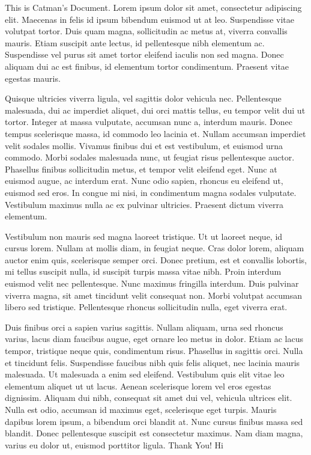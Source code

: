 \documentclass[11pt]{article}
\begin{document}
This is Catman's Document.
Lorem ipsum dolor sit amet, consectetur adipiscing elit. Maecenas in felis id ipsum bibendum euismod ut at leo. Suspendisse vitae volutpat tortor. Duis quam magna, sollicitudin ac metus at, viverra convallis mauris. Etiam suscipit ante lectus, id pellentesque nibh elementum ac. Suspendisse vel purus sit amet tortor eleifend iaculis non sed magna. Donec aliquam dui ac est finibus, id elementum tortor condimentum. Praesent vitae egestas mauris.

Quisque ultricies viverra ligula, vel sagittis dolor vehicula nec. Pellentesque malesuada, dui ac imperdiet aliquet, dui orci mattis tellus, eu tempor velit dui ut tortor. Integer at massa vulputate, accumsan nunc a, interdum mauris. Donec tempus scelerisque massa, id commodo leo lacinia et. Nullam accumsan imperdiet velit sodales mollis. Vivamus finibus dui et est vestibulum, et euismod urna commodo. Morbi sodales malesuada nunc, ut feugiat risus pellentesque auctor. Phasellus finibus sollicitudin metus, et tempor velit eleifend eget. Nunc at euismod augue, ac interdum erat. Nunc odio sapien, rhoncus eu eleifend ut, euismod sed eros. In congue mi nisi, in condimentum magna sodales vulputate. Vestibulum maximus nulla ac ex pulvinar ultricies. Praesent dictum viverra elementum.

Vestibulum non mauris sed magna laoreet tristique. Ut ut laoreet neque, id cursus lorem. Nullam at mollis diam, in feugiat neque. Cras dolor lorem, aliquam auctor enim quis, scelerisque semper orci. Donec pretium, est et convallis lobortis, mi tellus suscipit nulla, id suscipit turpis massa vitae nibh. Proin interdum euismod velit nec pellentesque. Nunc maximus fringilla interdum. Duis pulvinar viverra magna, sit amet tincidunt velit consequat non. Morbi volutpat accumsan libero sed tristique. Pellentesque rhoncus sollicitudin nulla, eget viverra erat.

Duis finibus orci a sapien varius sagittis. Nullam aliquam, urna sed rhoncus varius, lacus diam faucibus augue, eget ornare leo metus in dolor. Etiam ac lacus tempor, tristique neque quis, condimentum risus. Phasellus in sagittis orci. Nulla et tincidunt felis. Suspendisse faucibus nibh quis felis aliquet, nec lacinia mauris malesuada. Ut malesuada a enim sed eleifend. Vestibulum quis elit vitae leo elementum aliquet ut ut lacus. Aenean scelerisque lorem vel eros egestas dignissim. Aliquam dui nibh, consequat sit amet dui vel, vehicula ultrices elit. Nulla est odio, accumsan id maximus eget, scelerisque eget turpis. Mauris dapibus lorem ipsum, a bibendum orci blandit at. Nunc cursus finibus massa sed blandit. Donec pellentesque suscipit est consectetur maximus. Nam diam magna, varius eu dolor ut, euismod porttitor ligula.
Thank You! Hi
\end{document}
